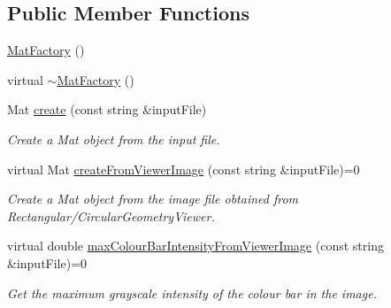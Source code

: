 \subsection*{\-Public \-Member \-Functions}
\begin{DoxyCompactItemize}
\item 
\hyperlink{classmultiscale_1_1analysis_1_1MatFactory_a454ca2abfbeb664e75f5365ac00eacff}{\-Mat\-Factory} ()
\item 
virtual \hyperlink{classmultiscale_1_1analysis_1_1MatFactory_aa339532cb504caebcf9ece2c847f4847}{$\sim$\-Mat\-Factory} ()
\item 
\-Mat \hyperlink{classmultiscale_1_1analysis_1_1MatFactory_a7800a989d808037fe96a9d5a692909b0}{create} (const string \&input\-File)
\begin{DoxyCompactList}\small\item\em \-Create a \-Mat object from the input file. \end{DoxyCompactList}\item 
virtual \-Mat \hyperlink{classmultiscale_1_1analysis_1_1MatFactory_a719ca9ac925ee182c1d5df1b0b029394}{create\-From\-Viewer\-Image} (const string \&input\-File)=0
\begin{DoxyCompactList}\small\item\em \-Create a \-Mat object from the image file obtained from \-Rectangular/\-Circular\-Geometry\-Viewer. \end{DoxyCompactList}\item 
virtual double \hyperlink{classmultiscale_1_1analysis_1_1MatFactory_a041b354357794476a2108e3f71deadc8}{max\-Colour\-Bar\-Intensity\-From\-Viewer\-Image} (const string \&input\-File)=0
\begin{DoxyCompactList}\small\item\em \-Get the maximum grayscale intensity of the colour bar in the image. \end{DoxyCompactList}\end{DoxyCompactItemize}
